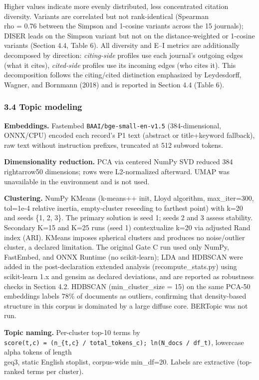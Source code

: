 \documentclass[pdflatex,sn-apa]{sn-jnl}
\begin{document}
Higher values indicate more evenly distributed, less concentrated
citation diversity. Variants are correlated but not rank-identical
(Spearman \\rho = 0.76 between the Simpson and 1-cosine variants across the
15 journals); DISER leads on the Simpson variant but not on the
distance-weighted or 1-cosine variants (Section 4.4, Table 6). All
diversity and E--I metrics are additionally decomposed by direction:
\emph{citing-side} profiles use each journal's outgoing edges (what it
cites), \emph{cited-side} profiles use its incoming edges (who cites
it). This decomposition follows the citing/cited distinction emphasized
by Leydesdorff, Wagner, and Bornmann (2018) and is reported in Section
4.4 (Table 6).

\subsubsection{3.4 Topic modeling}\label{topic-modeling}

\textbf{Embeddings.} Fastembed \texttt{BAAI/bge-small-en-v1.5}
(384-dimensional, ONNX/CPU) encoded each record's P1 text (abstract or
title+keyword fallback), raw text without instruction prefixes,
truncated at 512 subword tokens.

\textbf{Dimensionality reduction.} PCA via centered NumPy SVD reduced
384\\rightarrow50 dimensions; rows were L2-normalized afterward. UMAP was
unavailable in the environment and is not used.

\textbf{Clustering.} NumPy KMeans (k-means++ init, Lloyd algorithm,
max\_iter=300, tol=1e-4 relative inertia, empty-cluster reseeding to
farthest point) with k=20 and seeds \{1, 2, 3\}. The primary solution is
seed 1; seeds 2 and 3 assess stability. Secondary K=15 and K=25 runs
(seed 1) contextualize k=20 via adjusted Rand index (ARI). KMeans
imposes spherical clusters and produces no noise/outlier cluster, a
declared limitation. The original Gate C run used only NumPy, FastEmbed,
and ONNX Runtime (no scikit-learn); LDA and HDBSCAN were added in the
post-declaration extended analysis (recompute\_stats.py) using
scikit-learn 1.x and gensim as declared deviations, and are reported as
robustness checks in Section 4.2. HDBSCAN (min\_cluster\_size = 15) on
the same PCA-50 embeddings labels 78\% of documents as outliers,
confirming that density-based structure in this corpus is dominated by a
large diffuse core. BERTopic was not run.

\textbf{Topic naming.} Per-cluster top-10 terms by
\texttt{score(t,c)\ =\ (n\_\{t,c\}\ /\ total\_tokens\_c);\ ln(N\_docs\ /\ df\_t)},
lowercase alpha tokens of length \\geq3, static English stoplist,
corpus-wide min\_df=20. Labels are extractive (top-ranked terms per cluster).
\end{document}

